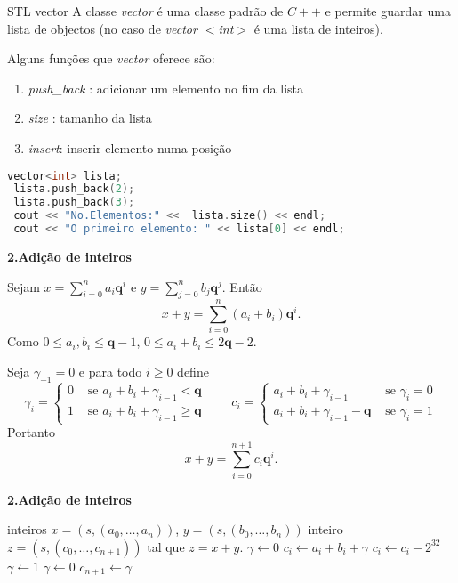 \documentclass{beamer}
\newcommand{\q}{\mathbf{q}}
\begin{document}
\begin{frame}[fragile]{STL vector}
A classe {\it vector} é uma classe padrão de $C++$ e permite guardar uma lista de objectos (no caso de {\it vector $<$int$>$} é uma lista de inteiros).

Alguns funções que {\it vector} oferece são:
\begin{enumerate}
 \item {\it push\_back} : adicionar um elemento no fim da lista
\item {\it size} : tamanho da lista
\item {\it insert}: inserir elemento numa posição
\end{enumerate}

\begin{lstlisting}[language=C++]
 vector<int> lista;
 lista.push_back(2);
 lista.push_back(3);
 cout << "No.Elementos:" <<  lista.size() << endl;
 cout << "O primeiro elemento: " << lista[0] << endl;
\end{lstlisting}

\end{frame}


\begin{frame}{\bf 2.}{\bf Adição de inteiros}

Sejam $x=\sum_{i=0}^n a_i \q^i$ e $y=\sum_{j=0}^n b_j \q^j$. Então 
$$x+y = \sum_{i=0}^n (a_i+b_i) \q^i.$$
Como $0\leq a_i, b_i \leq \q-1$, $ 0\leq a_i + b_i \leq 2\q-2.$

Seja $\gamma_{-1} = 0$ e para todo $i\geq 0$ define
{\small $$\gamma_i = \left\{ \begin{array}{cc} 0 & \mbox{ se } a_i+b_i+\gamma_{i-1} < \q\\ 1 & \mbox{ se } a_i+b_i+\gamma_{i-1} \geq \q \end{array} \right. \qquad
 c_i = \left\{ \begin{array}{lc} a_i+b_i+\gamma_{i-1} & \mbox{ se } \gamma_i=0 \\ a_i+b_i+\gamma_{i-1}-\q &  \mbox{ se } \gamma_i=1 \end{array} \right. $$}
Portanto $$x+y = \sum_{i=0}^{n+1} c_i \q^i.$$
 
\end{frame}




\begin{frame}[fragile]{\bf 2.}{\bf Adição de inteiros}
\begin{algorithmic}
\REQUIRE inteiros $x=(s,(a_0,\ldots, a_n))$, $y=(s,(b_0,\ldots, b_n))$
\ENSURE inteiro $z=(s, (c_0, \ldots, c_{n+1}))$ tal que $z=x+y$.
\STATE $\gamma \leftarrow 0$ 
  \STATE $c_i \leftarrow a_i+b_i+\gamma$
        \STATE $c_i \leftarrow c_i - 2^{32}$
        \STATE $\gamma \leftarrow 1$
  \ELSE
	\STATE $\gamma \leftarrow 0$
  \ENDIF
\ENDFOR
\STATE $c_{n+1}\leftarrow \gamma$
\end{algorithmic}

\end{frame}
\end{document}
